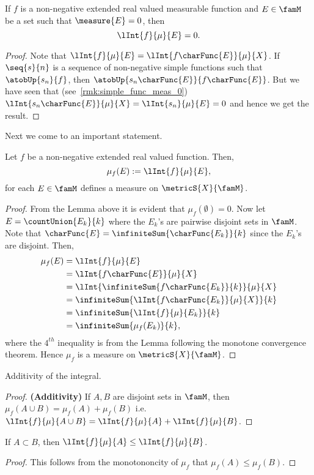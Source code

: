 \begin{Lemma}\label{lemma:int_set_meas_0}
    If $f$ is a non-negative extended real valued measurable function and $E\in \famM$ be a set such that
    $\measure{E} = 0$, then
    \[\lInt{f}{\mu}{E}= 0.\]
\end{Lemma}
\begin{proof}
    Note that $\lInt{f}{\mu}{E} = \lInt{f\charFunc{E}}{\mu}{X}$. If $\seq{s}{n}$ is a sequence of non-negative
    simple functions such that $\atobUp{s_n}{f}$, then $\atobUp{s_n\charFunc{E}}{f\charFunc{E}}$. But we have
    seen that (see~\ref{rmk:simple_func_meas_0}) $\lInt{s_n\charFunc{E}}{\mu}{X} = \lInt{s_n}{\mu}{E} = 0$ 
    and hence we get the result. 
\end{proof}
Next we come to an important statement.
\begin{Theorem}\label{thm:int_induces_meas}
    Let $f$ be a non-negative extended real valued function. Then,
    \[\mu_f(E) := \lInt{f}{\mu}{E},\]
    for each $E \in \famM$ defines a measure on $\metricS{X}{\famM}$.
\end{Theorem}
\begin{proof}
    From the Lemma above it is evident that $\mu_f(\emptyset) = 0$. Now let $E = \countUnion{E_k}{k}$ where
    the $E_k$'s are pairwise disjoint sets in $\famM$. Note that $\charFunc{E} =
    \infiniteSum{\charFunc{E_k}}{k}$ since the $E_k$'s are disjoint.
    Then,
    \begin{align*}
	\mu_f(E) &= \lInt{f}{\mu}{E}\\
	&= \lInt{f\charFunc{E}}{\mu}{X}\\
	&=\lInt{\infiniteSum{f\charFunc{E_k}}{k}}{\mu}{X}\\
	&=\infiniteSum{\lInt{f\charFunc{E_k}}{\mu}{X}}{k}\\
	&=\infiniteSum{\lInt{f}{\mu}{E_k}}{k}\\
	&=\infiniteSum{\mu_f(E_k)}{k},\\
    \end{align*}
    where the $4^{th}$ inequality is from the Lemma following the monotone convergence theorem. Hence $\mu_f$
    is a measure on $\metricS{X}{\famM}$.
\end{proof}
\begin{Corollary}[name=Additivity]
    Additivity of the integral.
\end{Corollary}
\begin{proof}
    \textbf{(Additivity)} If $A,B$ are disjoint sets in $\famM$, then $\mu_f(A\cup B) = \mu_f(A)
    +\mu_f(B)$ i.e.~$\lInt{f}{\mu}{A\cup B} = \lInt{f}{\mu}{A} + \lInt{f}{\mu}{B}$.
\end{proof}
\begin{Corollary}
    If $A \subset B$, then $\lInt{f}{\mu}{A} \leq \lInt{f}{\mu}{B}$.
\end{Corollary}
\begin{proof}
    This follows from the monotononcity of $\mu_f$ that $\mu_f(A) \leq \mu_f(B)$. 
\end{proof}

